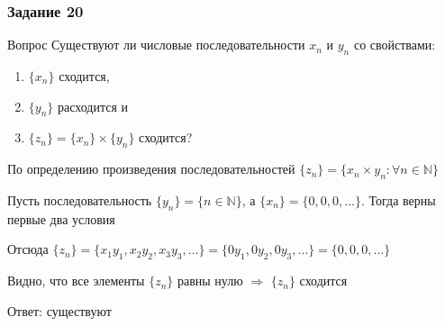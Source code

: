 \documentclass[8pt]{beamer}
\begin{document}
  \begin{frame}
    \frametitle{Задание 20}

    \begin{block}{Вопрос}
      Существуют ли числовые последовательности $x_n$ и $y_n$ со свойствами:
      \begin{enumerate}
        \item $\{x_n\}$ сходится,
        \item $\{y_n\}$ расходится и
        \item $\{z_n\} = \{x_n\} \times \{y_n\}$ сходится?
      \end{enumerate}
    \end{block} \pause

    По определению произведения последовательностей $\{z_n\} = \{x_n \times y_n: \forall n \in \mathbb{N}\}$ \pause

    Пусть последовательность $\{y_n\} = \{n \in \mathbb{N}\}$, а $\{x_n\} = \{0, 0, 0, \dots\}$. Тогда верны первые два условия \pause
  
    Отсюда $\{z_n\} = \{x_1y_1, x_2y_2, x_3y_3, \dots\} = \{0y_1, 0y_2, 0y_3, \dots\} = \{0, 0, 0, \dots\}$ \pause

    Видно, что все элементы $\{z_n\}$ равны нулю $\Rightarrow$ $\{z_n\}$ сходится \pause

    \begin{flushright}
      Ответ: существуют
    \end{flushright}
  \end{frame}
\end{document}
